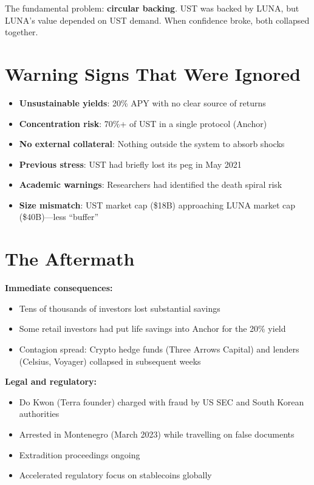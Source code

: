 \documentclass[11pt]{article}
\begin{document}
The fundamental problem: \textbf{circular backing}. UST was backed by LUNA, but LUNA's value depended on UST demand. When confidence broke, both collapsed together.

\section*{Warning Signs That Were Ignored}

\begin{itemize}[leftmargin=*]
\item \textbf{Unsustainable yields}: 20\% APY with no clear source of returns
\item \textbf{Concentration risk}: 70\%+ of UST in a single protocol (Anchor)
\item \textbf{No external collateral}: Nothing outside the system to absorb shocks
\item \textbf{Previous stress}: UST had briefly lost its peg in May 2021
\item \textbf{Academic warnings}: Researchers had identified the death spiral risk
\item \textbf{Size mismatch}: UST market cap (\$18B) approaching LUNA market cap (\$40B)---less ``buffer''
\end{itemize}

\section*{The Aftermath}

\textbf{Immediate consequences:}
\begin{itemize}[leftmargin=*]
\item Tens of thousands of investors lost substantial savings
\item Some retail investors had put life savings into Anchor for the 20\% yield
\item Contagion spread: Crypto hedge funds (Three Arrows Capital) and lenders (Celsius, Voyager) collapsed in subsequent weeks
\end{itemize}

\medskip
\noindent\textbf{Legal and regulatory:}
\begin{itemize}[leftmargin=*]
\item Do Kwon (Terra founder) charged with fraud by US SEC and South Korean authorities
\item Arrested in Montenegro (March 2023) while travelling on false documents
\item Extradition proceedings ongoing
\item Accelerated regulatory focus on stablecoins globally
\end{itemize}
\end{document}
